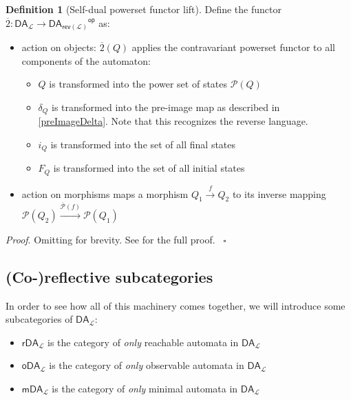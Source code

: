 \documentclass{article}
\theoremstyle{plain}
\theoremstyle{definition}
\newtheorem{definition}{Definition}
\begin{document}
\begin{definition}[Self-dual powerset functor lift]
 Define the functor \ensuremath{\overline{2} : {\mathsf{DA}}_{\mathcal{L}} \rightarrow {{\mathsf{DA}}_{\mathsf{rev}\left( \mathcal{L} \right)}}^{\mathsf{op}}} as:

\begin{itemize}
\item action on objects: \ensuremath{\overline{2}\left( Q \right)} applies the contravariant powerset functor to all components of the automaton: \begin{itemize}
\item \ensuremath{Q} is transformed into the power set of states \ensuremath{\mathcal{P}\left( Q \right)}
\item \ensuremath{{\delta }_{Q}} is transformed into the pre-image map as described in \ref{preImageDelta}. Note that this recognizes the reverse language.
\item \ensuremath{{i}_{Q}} is transformed into the set of all final states
\item \ensuremath{{F}_{Q}} is transformed into the set of all initial states
\end{itemize}

\item action on morphisms maps a morphism \ensuremath{{Q}_{1} \xrightarrow{f} {Q}_{2}} to its inverse mapping \ensuremath{\mathcal{P}\left( {Q}_{2} \right) \xrightarrow{\overline{\mathcal{P}}\left( f \right)} \mathcal{P}\left( {Q}_{1} \right)}
\end{itemize}

\end{definition}
\label{F2Def} 

\emph{Proof}.  Omitting for brevity. See \cite{bonchiAlgebracoalgebraDualityBrzozowskis2014} for the full proof.  ~\ensuremath{\square}

\subsection{(Co-)reflective subcategories}


In order to see how all of this machinery comes together, we will introduce some subcategories of \ensuremath{{\mathsf{DA}}_{\mathcal{L}}}: \begin{itemize}
\item \ensuremath{{\mathsf{rDA}}_{\mathcal{L}}} is the category of \emph{only} reachable automata in \ensuremath{{\mathsf{DA}}_{\mathcal{L}}}
\item \ensuremath{{\mathsf{oDA}}_{\mathcal{L}}} is the category of \emph{only} observable automata in \ensuremath{{\mathsf{DA}}_{\mathcal{L}}}
\item \ensuremath{{\mathsf{mDA}}_{\mathcal{L}}} is the category of \emph{only} minimal automata in \ensuremath{{\mathsf{DA}}_{\mathcal{L}}}
\end{itemize}
\end{document}
